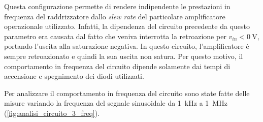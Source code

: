 \noindent
Questa configurazione permette di rendere indipendente le prestazioni in frequenza del raddrizzatore dallo \textit{slew rate} del particolare amplificatore operazionale utilizzato. Infatti, la dipendenza del circuito precedente da questo parametro era causata dal fatto che veniva interrotta la retroazione per $v_{in}<\SI{0}{\volt}$, portando l'uscita alla saturazione negativa. In questo circuito, l'amplificatore è sempre retroazionato e quindi la sua uscita non satura. Per questo motivo, il comportamento in frequenza del circuito dipende solamente dai tempi di accensione e spegnimento dei diodi utilizzati. 

\noindent
Per analizzare il comportamento in frequenza del circuito sono state fatte delle misure variando la frequenza del segnale sinusoidale da \SI{1}{\kilo\hertz} a \SI{1}{\mega\hertz} (\Fig\ref{fig:analisi_circuito_3_freq}).
